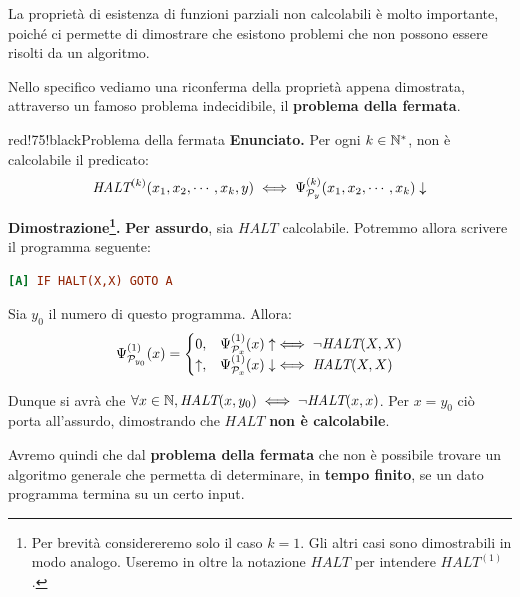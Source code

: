 La proprietà di esistenza di funzioni parziali non calcolabili è molto importante, poiché ci permette di dimostrare che esistono problemi che non possono essere risolti da un algoritmo.

Nello specifico vediamo una riconferma della proprietà appena dimostrata, attraverso un famoso problema indecidibile, il \textbf{problema della fermata}.

\newpage
\begin{halfframedbox}{red!75!black}{Problema della fermata}\label{Problema della Fermata}
  \textbf{Enunciato. } Per ogni \(k\in\mathbb{N}^*\), non è calcolabile il predicato:
  \begin{equation}
    \textit{HALT}^{(k)}(x_1,x_2,\cdots, x_k,y) \iff \Psi_{\mathcal{P}_y}^{(k)}(x_1,x_2, \cdots , x_k)\downarrow
  \end{equation}
  \begin{center}
    \textcolor{red!75!black}{\hdashrule[0.5ex]{18cm}{1pt}{3mm 3pt 1mm 2pt}}
  \end{center}

  \textbf{Dimostrazione\footnote{Per brevità considereremo solo il caso \(k=1\). Gli altri casi sono dimostrabili in modo analogo. Useremo in oltre la notazione \(\textit{HALT}\) per intendere \(\textit{HALT}^{(1)}\).}.}
  \textbf{Per assurdo}, sia \(\textit{HALT}\) calcolabile. Potremmo allora scrivere il programma seguente:
  \begin{lstlisting}[language=ini, caption=Dimotrazione Problema della Fermata]
    [A] IF HALT(X,X) GOTO A
  \end{lstlisting}
  Sia \(y_0\) il numero di questo programma. Allora:
  \begin{equation}
    \Psi_{\mathcal{P}_{y_0}}^{(1)}(x)=\begin{cases}
      0, & \Psi_{\mathcal{P}_{x}}^{(1)}(x) \uparrow \iff \neg \textit{HALT}(X,X)\\
      \uparrow, & \Psi_{\mathcal{P}_{x}}^{(1)}(x) \downarrow \iff \textit{HALT}(X,X)
    \end{cases}
  \end{equation}

  Dunque si avrà che \(\forall x \in \mathbb{N}, \textit{HALT}(x,y_0)\iff \neg \textit{HALT}(x,x)\). Per \(x=y_0\) ciò porta all'assurdo, dimostrando che \(\textit{HALT}\) \textbf{non è calcolabile}.
\end{halfframedbox}

Avremo quindi che dal \textbf{problema della fermata} che non è possibile trovare un algoritmo generale che permetta di determinare, in \textbf{tempo finito}, se un dato programma termina su un certo input.

